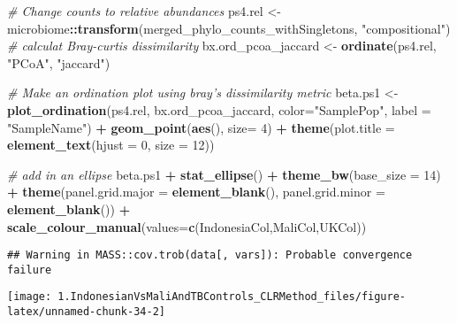 \documentclass[]{article}
\newenvironment{Shaded}{\begin{snugshade}}{\end{snugshade}}
\newcommand{\CommentTok}[1]{\textcolor[rgb]{0.56,0.35,0.01}{\textit{#1}}}
\newcommand{\DataTypeTok}[1]{\textcolor[rgb]{0.13,0.29,0.53}{#1}}
\newcommand{\DecValTok}[1]{\textcolor[rgb]{0.00,0.00,0.81}{#1}}
\newcommand{\KeywordTok}[1]{\textcolor[rgb]{0.13,0.29,0.53}{\textbf{#1}}}
\newcommand{\NormalTok}[1]{#1}
\newcommand{\OperatorTok}[1]{\textcolor[rgb]{0.81,0.36,0.00}{\textbf{#1}}}
\newcommand{\StringTok}[1]{\textcolor[rgb]{0.31,0.60,0.02}{#1}}
\begin{document}
\begin{Shaded}
\begin{Highlighting}[]
\CommentTok{# Change counts to relative abundances}
\NormalTok{ps4.rel <-}\StringTok{ }\NormalTok{microbiome}\OperatorTok{::}\KeywordTok{transform}\NormalTok{(merged_phylo_counts_withSingletons, }\StringTok{"compositional"}\NormalTok{)}
\CommentTok{# calculat Bray-curtis dissimilarity}
\NormalTok{bx.ord_pcoa_jaccard <-}\StringTok{ }\KeywordTok{ordinate}\NormalTok{(ps4.rel, }\StringTok{"PCoA"}\NormalTok{, }\StringTok{"jaccard"}\NormalTok{)}

\CommentTok{# Make an ordination plot using bray's dissimilarity metric}
\NormalTok{beta.ps1 <-}\StringTok{ }\KeywordTok{plot_ordination}\NormalTok{(ps4.rel, }
\NormalTok{                            bx.ord_pcoa_jaccard, }
                            \DataTypeTok{color=}\StringTok{"SamplePop"}\NormalTok{, }
                            \DataTypeTok{label =} \StringTok{"SampleName"}\NormalTok{) }\OperatorTok{+}\StringTok{ }
\StringTok{  }\KeywordTok{geom_point}\NormalTok{(}\KeywordTok{aes}\NormalTok{(), }\DataTypeTok{size=} \DecValTok{4}\NormalTok{) }\OperatorTok{+}\StringTok{ }
\StringTok{  }\KeywordTok{theme}\NormalTok{(}\DataTypeTok{plot.title =} \KeywordTok{element_text}\NormalTok{(}\DataTypeTok{hjust =} \DecValTok{0}\NormalTok{, }\DataTypeTok{size =} \DecValTok{12}\NormalTok{))}

\CommentTok{# add in an ellipse}
\NormalTok{beta.ps1 }\OperatorTok{+}\StringTok{ }\KeywordTok{stat_ellipse}\NormalTok{() }\OperatorTok{+}\StringTok{ }\KeywordTok{theme_bw}\NormalTok{(}\DataTypeTok{base_size =} \DecValTok{14}\NormalTok{) }\OperatorTok{+}\StringTok{ }
\StringTok{  }\KeywordTok{theme}\NormalTok{(}\DataTypeTok{panel.grid.major =} \KeywordTok{element_blank}\NormalTok{(), }\DataTypeTok{panel.grid.minor =} \KeywordTok{element_blank}\NormalTok{()) }\OperatorTok{+}
\StringTok{  }\KeywordTok{scale_colour_manual}\NormalTok{(}\DataTypeTok{values=}\KeywordTok{c}\NormalTok{(IndonesiaCol,MaliCol,UKCol))}
\end{Highlighting}
\end{Shaded}

\begin{verbatim}
## Warning in MASS::cov.trob(data[, vars]): Probable convergence failure
\end{verbatim}

\begin{center}\texttt{[image: 1.IndonesianVsMaliAndTBControls\_CLRMethod\_files/figure-latex/unnamed-chunk-34-2]} \end{center}
\end{document}
